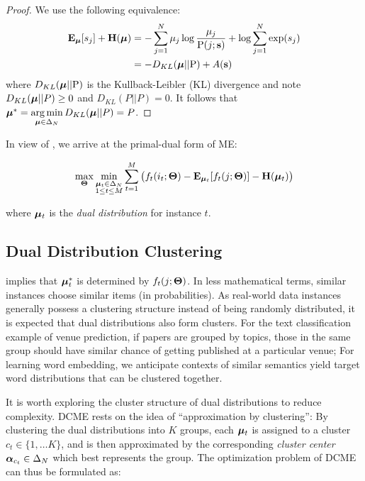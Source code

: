 \begin{proof}
  We use the following equivalence:
  \begin{align*}
    \mathbf{E}_{\boldsymbol{\mu}}[s_j] + \mathbf{H}(\boldsymbol{\mu})
      &= -\sum\limits_{j=1}^N \mu_j \log \frac{\mu_j }{ \mathrm{P}(j; \mathbf{s}) } +
          \log\sum\limits_{j=1}^N \exp(s_j) \nonumber \\
      &= -D_{KL}(\boldsymbol{\mu} || \mathrm{P}) + A(\mathbf{s})
  \end{align*}
where $D_{KL}(\boldsymbol{\mu} || \mathrm{P})$ is the Kullback-Leibler (KL) divergence and note
$D_{KL}(\boldsymbol{\mu} || P) \ge 0$ and  $D_{KL}(P || P) = 0$. It follows that
$\boldsymbol{\mu}^* = \operatorname*{arg\,min}\limits_{\boldsymbol{\mu} \in \Delta_N} D_{KL}(\boldsymbol{\mu} || P) = P$.
\end{proof}

In view of , we arrive at the primal-dual form of ME:

\begin{equation}
  \max\limits_{\mathbf{\Theta}}
  \min\limits_{\substack{\boldsymbol{\mu}_t \in \Delta_N \\ 1 \le t \le M}}
  \sum\limits_{t=1}^M \big( f_t(i_t; \mathbf{\Theta}) - \mathbf{E}_{\boldsymbol{\mu}_t}[f_t(j;\mathbf{\Theta})] -
  \mathbf{H}(\boldsymbol{\mu}_t) \big) \label{eq::me_primal_dual}
\end{equation}

where $\boldsymbol{\mu}_t$ is the \emph{dual distribution} for instance $t$.

\subsection{Dual Distribution Clustering}

 implies that $\boldsymbol{\mu}_t^*$ is determined by $f_t(j;\mathbf{\Theta})$.
In less mathematical terms, similar instances choose similar items (in
probabilities). As real-world data instances generally possess a clustering
structure instead of being randomly distributed, it is expected that dual
distributions also form clusters. For the text classification example of venue
prediction, if papers are grouped by topics, those in the same group should have
similar chance of getting published at a particular venue; For learning word
embedding, we anticipate contexts of similar semantics yield target word
distributions that can be clustered together.

It is worth exploring the cluster structure of dual distributions to reduce
complexity. DCME rests on the idea of ``approximation by clustering'': By
clustering the dual distributions into $K$ groups, each $\boldsymbol{\mu}_t$ is assigned to
a cluster $c_t \in \{1, \dots K\}$, and is then approximated by the
corresponding \emph{cluster center} $\boldsymbol{\alpha}_{c_t}\in\Delta_N$ which best
represents the group. The optimization problem of DCME can thus be formulated
as:

